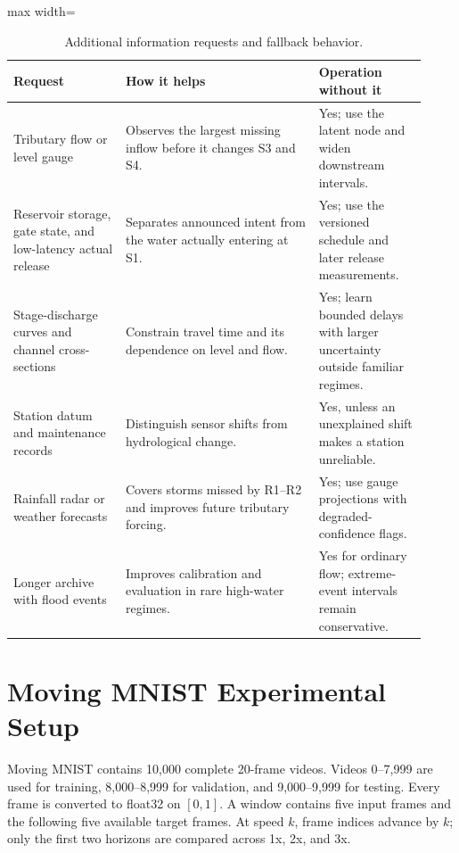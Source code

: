 \documentclass{article}
\begin{document}
\begin{table}[htbp]
\centering
\caption*{Additional information requests and fallback behavior.}
\footnotesize
\begin{adjustbox}{max width=\linewidth}
\begin{tabular}{>{\raggedright\arraybackslash}p{0.25\linewidth}>{\raggedright\arraybackslash}p{0.43\linewidth}>{\raggedright\arraybackslash}p{0.24\linewidth}}
\toprule
Request & How it helps & Operation without it \\
\midrule
Tributary flow or level gauge & Observes the largest missing inflow before it changes S3 and S4. & Yes; use the latent node and widen downstream intervals. \\
Reservoir storage, gate state, and low-latency actual release & Separates announced intent from the water actually entering at S1. & Yes; use the versioned schedule and later release measurements. \\
Stage-discharge curves and channel cross-sections & Constrain travel time and its dependence on level and flow. & Yes; learn bounded delays with larger uncertainty outside familiar regimes. \\
Station datum and maintenance records & Distinguish sensor shifts from hydrological change. & Yes, unless an unexplained shift makes a station unreliable. \\
Rainfall radar or weather forecasts & Covers storms missed by R1--R2 and improves future tributary forcing. & Yes; use gauge projections with degraded-confidence flags. \\
Longer archive with flood events & Improves calibration and evaluation in rare high-water regimes. & Yes for ordinary flow; extreme-event intervals remain conservative. \\
\bottomrule
\end{tabular}
\end{adjustbox}
\end{table}

\FloatBarrier

\section{Moving MNIST Experimental Setup}
\label{sec:q2-setup}

Moving MNIST contains 10,000 complete 20-frame videos. Videos 0--7,999 are used for training, 8,000--8,999 for validation, and 9,000--9,999 for testing. Every frame is converted to float32 on $[0,1]$. A window contains five input frames and the following five available target frames. At speed $k$, frame indices advance by $k$; only the first two horizons are compared across 1x, 2x, and 3x.
\end{document}
